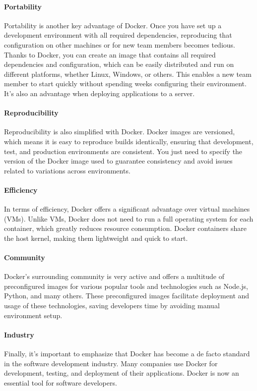 \documentclass[french]{article}
\begin{document}
\paragraph{Portability}
Portability is another key advantage of Docker.
Once you have set up a development environment with all required dependencies, reproducing that configuration on other machines or for new team members becomes tedious.
Thanks to Docker, you can create an image that contains all required dependencies and configuration, which can be easily distributed and run on different platforms, whether Linux, Windows, or others.
This enables a new team member to start quickly without spending weeks configuring their environment.
It’s also an advantage when deploying applications to a server.

\paragraph{Reproducibility}
Reproducibility is also simplified with Docker.
Docker images are versioned, which means it is easy to reproduce builds identically, ensuring that development, test, and production environments are consistent.
You just need to specify the version of the Docker image used to guarantee consistency and avoid issues related to variations across environments.

\paragraph{Efficiency}
In terms of efficiency, Docker offers a significant advantage over virtual machines (VMs).
Unlike VMs, Docker does not need to run a full operating system for each container, which greatly reduces resource consumption.
Docker containers share the host kernel, making them lightweight and quick to start.

\paragraph{Community}
Docker’s surrounding community is very active and offers a multitude of preconfigured images for various popular tools and technologies such as Node.js, Python, and many others.
These preconfigured images facilitate deployment and usage of these technologies, saving developers time by avoiding manual environment setup.

\paragraph{Industry}
Finally, it’s important to emphasize that Docker has become a de facto standard in the software development industry.
Many companies use Docker for development, testing, and deployment of their applications.
Docker is now an essential tool for software developers.
\end{document}

